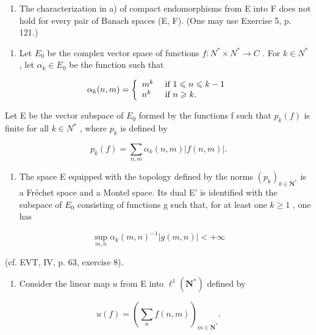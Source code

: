 \begin{enumerate}
\def\labelenumi{\alph{enumi})}
\setcounter{enumi}{1}
\tightlist
\item
  The characterization in a) of compact endomorphisms from E into F does not hold for every pair of Banach spaces (E, F). (One may use Exercise 5, p. 121.)
\end{enumerate}

\begin{enumerate}
\def\labelenumi{\arabic{enumi})}
\setcounter{enumi}{14}
\tightlist
\item
  Let \(E_{0}\) be the complex vector space of functions \(f: N^{*} \times N^{*} \to C\) . For \(k \in N^{*}\) , let \(\alpha_{k} \in E_{0}\) be the function such that
\end{enumerate}

\[
\alpha_ {k} (n, m) = \left\{ \begin{array}{l l} m ^ {k} & \text { if } 1 \leqslant n \leqslant k - 1 \\ n ^ {k} & \text { if } n \geqslant k. \end{array} \right.
\]

Let E be the vector subspace of \(E_{0}\) formed by the functions f such that \(p_{k}(f)\) is finite for all \(k \in N^{*}\) , where \(p_{k}\) is defined by

\[
p _ {k} (f) = \sum_ {n, m} \alpha_ {k} (n, m) | f (n, m) |.
\]

\begin{enumerate}
\def\labelenumi{\alph{enumi})}
\tightlist
\item
  The space E equipped with the topology defined by the norms \((p_{k})_{k\in\mathbf{N}^{*}}\) is a Fréchet space and a Montel space. Its dual E' is identified with the subspace of \(E_{0}\) consisting of functions g such that, for at least one \(k\geqslant1\) , one has
\end{enumerate}

\[
\sup _ {m, n} \alpha_ {k} (m, n) ^ {- 1} | g (m, n) | <   + \infty
\]

(cf. EVT, IV, p. 63, exercise 8).

\begin{enumerate}
\def\labelenumi{\alph{enumi})}
\setcounter{enumi}{1}
\tightlist
\item
  Consider the linear map \(u\) from E into \(\ell^1 (\mathbf{N}^*)\) defined by
\end{enumerate}

\[
u (f) = \left(\sum_ {n} f (n, m)\right) _ {m \in \mathbf {N} ^ {*}}.
\]

